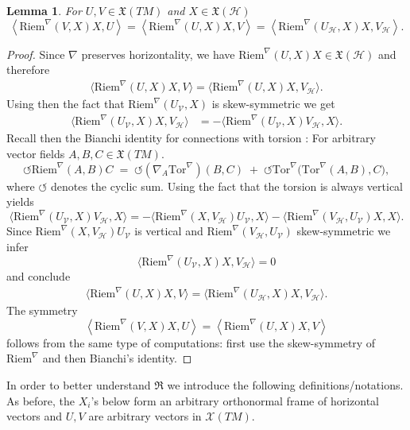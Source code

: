 \documentclass[11pt]{article}
\numberwithin{equation}{section}
\newtheorem{lemma}[theorem]{Lemma}
\newcommand{\Riem}{\mathrm{Riem}}
\newcommand{\Ho}{\mathcal H}
\newcommand{\V}{\mathcal V}
\newcommand{\Tor}{\mathrm{Tor}}
\begin{document}
\begin{lemma}\label{sym Ricci}
For $U,V \in \mathfrak{X}(TM)$ and $X \in \mathfrak{X}(\Ho)$
\[
\left\langle \mathrm{Riem}^\nabla(V,X)X, U \right \rangle=\left\langle \mathrm{Riem}^\nabla(U,X)X, V \right \rangle=\left \langle \mathrm{Riem}^\nabla(U_\Ho,X)X, V_\Ho \right \rangle.
\]
\end{lemma}
\begin{proof}
Since $\nabla$ preserves horizontality, we have $\mathrm{Riem}^\nabla(U,X)X \in  \mathfrak{X}(\Ho)$ and therefore
\begin{align*}
 \langle \mathrm{Riem}^\nabla(U,X)X, V \rangle= \langle \mathrm{Riem}^\nabla(U,X)X,  V_\mathcal{H} \rangle.
\end{align*}
 Using then the fact that $  \mathrm{Riem}^\nabla(U_\V,X)$ is skew-symmetric  we get
\begin{align*}
 \langle \mathrm{Riem}^\nabla(U_\V,X)X, V_\Ho \rangle&=- \langle \mathrm{Riem}^\nabla(U_\V,X)V_\Ho, X \rangle.
\end{align*}
Recall then the Bianchi identity for connections with torsion \cite[Theorem 1.24]{Besse}: For arbitrary vector fields $A,B,C\in\mathfrak{X}(TM)$.
\begin{equation}\label{eq:bianchi}
  \circlearrowleft \Riem^\nabla(A,B)C
  \;=\;
  \circlearrowleft (\nabla_A \Tor^\nabla)(B,C)
  \;+\;
  \circlearrowleft \Tor^\nabla\big(\Tor^\nabla(A,B),C\big),
\end{equation}
where  $\circlearrowleft$ denotes the cyclic sum.  Using the fact that the torsion is always vertical yields
\[
\langle \mathrm{Riem}^\nabla(U_\V,X)V_\Ho, X \rangle=-\langle \mathrm{Riem}^\nabla(X, V_\Ho)U_\V, X \rangle-\langle \mathrm{Riem}^\nabla( V_\Ho,U_\V)X, X \rangle.
\]
Since $ \mathrm{Riem}^\nabla(X, V_\Ho)U_\V$ is vertical and $\mathrm{Riem}^\nabla(V_\Ho,U_\V)$ skew-symmetric we infer
\[
 \langle \mathrm{Riem}^\nabla(U_\V,X)X, V_\Ho \rangle=0
\]
and conclude
\begin{align*}
 \langle \mathrm{Riem}^\nabla(U,X)X, V \rangle= \langle \mathrm{Riem}^\nabla(U_\Ho,X)X,  V_\mathcal{H} \rangle.
\end{align*}
The symmetry 
\[
\left\langle \mathrm{Riem}^\nabla(V,X)X, U \right \rangle=\left\langle \mathrm{Riem}^\nabla(U,X)X, V \right \rangle
\]
follows from the same type of computations: first use the skew-symmetry of $\mathrm{Riem}^\nabla$ and then Bianchi's identity.
\end{proof}

In order to better understand  $\mathfrak{R}$ we introduce the following definitions/notations.  As before, the $X_i$'s below form an arbitrary orthonormal frame of horizontal vectors and $U, V$ are arbitrary vectors  in $\mathcal{X}(TM)$.
\end{document}
